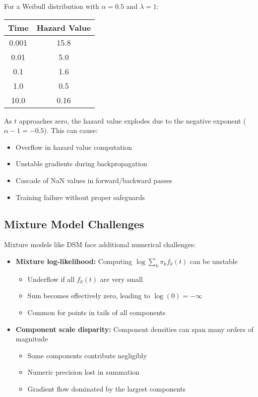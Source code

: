 \begin{examplebox}[title=Weibull Hazard Calculation Issues]
For a Weibull distribution with $\alpha = 0.5$ and $\lambda = 1$:
\begin{center}
    \begin{tabular}{|c|c|}
        \hline
        \textbf{Time} & \textbf{Hazard Value} \\
        \hline
        0.001 & 15.8 \\
        0.01 & 5.0 \\
        0.1 & 1.6 \\
        1.0 & 0.5 \\
        10.0 & 0.16 \\
        \hline
    \end{tabular}
\end{center}

As $t$ approaches zero, the hazard value explodes due to the negative exponent ($\alpha-1 = -0.5$). This can cause:
\begin{itemize}
    \item Overflow in hazard value computation
    \item Unstable gradients during backpropagation
    \item Cascade of NaN values in forward/backward passes
    \item Training failure without proper safeguards
\end{itemize}
\end{examplebox}

\subsection{Mixture Model Challenges}

Mixture models like DSM face additional numerical challenges:

\begin{itemize}
    \item \textbf{Mixture log-likelihood:} Computing $\log \sum_k \pi_k f_k(t)$ can be unstable
    \begin{itemize}
        \item Underflow if all $f_k(t)$ are very small
        \item Sum becomes effectively zero, leading to $\log(0) = -\infty$
        \item Common for points in tails of all components
    \end{itemize}
    
    \item \textbf{Component scale disparity:} Component densities can span many orders of magnitude
    \begin{itemize}
        \item Some components contribute negligibly
        \item Numeric precision lost in summation
        \item Gradient flow dominated by the largest components
    \end{itemize}
\end{itemize}

